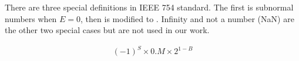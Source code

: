 There are three special definitions in IEEE 754 standard. The first is subnormal numbers when $E=0$, then  is modified to . Infinity and not a number (NaN) are the other two special cases but are not used in our work.

\begin{eqnarray} \label{eq:float_subnorm}
(-1)^{S} \times 0.M \times 2^{1-B}
\end{eqnarray}